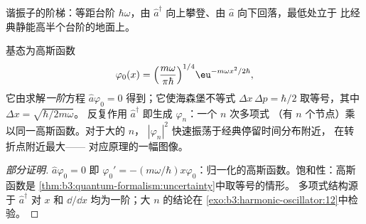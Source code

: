\begin{omfigure}

{\small 谐振子的阶梯：等距台阶 $\hbar\omega$，由
$\hat a^\dagger$ 向上攀登、由 $\hat a$ 向下回落，最低处立于
比经典静能高半个台阶的地面上。}
\end{omfigure}

\begin{proposition}[空间中的态]\label{prop:b3:harmonic-oscillator:wavefunctions}
基态为高斯函数
\[
\varphi_0(x) = \Big(\frac{m\omega}{\pi\hbar}\Big)^{1/4}
\eu^{-m\omega x^2/2\hbar} ,
\]
它由求解\emph{一阶}方程 $\hat a\varphi_0
= 0$ 得到；它使海森堡不等式 $\Delta x\,\Delta p =
\hbar/2$ 取等号，其中 $\Delta x = \sqrt{\hbar/2m\omega}$。
反复作用 $\hat a^\dagger$ 即生成 $\varphi_n$：一个 $n$ 次多项式
（有 $n$ 个节点）乘以同一高斯函数。对于大的 $n$，
$|\varphi_n|^2$ 快速振荡于经典停留时间分布附近，
在转折点附近最大——
对应原理的一幅图像。
\end{proposition}

\begin{proof}[部分证明]
$\hat a\varphi_0 = 0$ 即 $\varphi_0' = -(m\omega/\hbar)x
\varphi_0$：归一化的高斯函数。饱和性：高斯函数是
\cref{thm:b3:quantum-formalism:uncertainty}中取等号的情形。
多项式结构源于 $\hat a^\dagger$ 对 $x$
和 $\dd/\dd x$ 均为一阶；大 $n$ 的结论在
\cref{exo:b3:harmonic-oscillator:12}中检验。
\end{proof}

